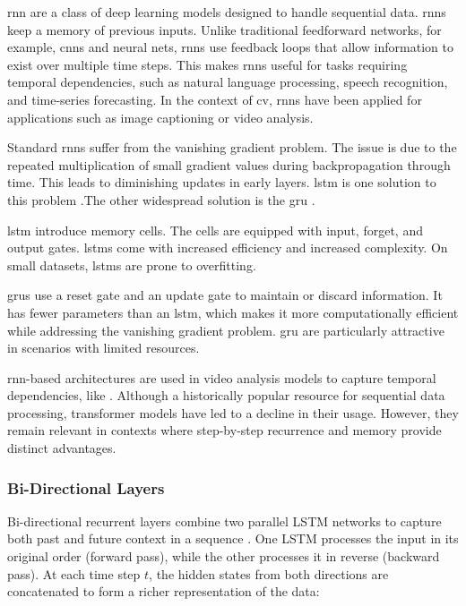 \acrfull{rnn} are a class of deep learning models designed to handle sequential data. \acrshort{rnn}s keep a memory of previous inputs. Unlike traditional feedforward networks, for example, \acrshort{cnn}s and neural nets, \acrshort{rnn}s use feedback loops that allow information to exist over multiple time steps.  This makes \acrshort{rnn}s useful for tasks requiring temporal dependencies, such as natural language processing, speech recognition, and time-series forecasting\cite{ibm_rnn_2025}. In the context of \acrfull{cv}, \acrshort{rnn}s have been applied for applications such as image captioning or video analysis. 

Standard \acrshort{rnn}s suffer from the vanishing gradient problem. The issue is due to the repeated multiplication of small gradient values during backpropagation through time. This leads to diminishing updates in early layers. \acrfull{lstm} is one solution to this problem \cite{bhogal_human_2023, kumar_human_2023, mahaseni_spotting_2021}.The other widespread solution is the \acrfull{gru} \cite{giveki_human_2024,li_oarnet_2024,yu_i3d_2023}. 

\acrlong{lstm} introduce memory cells. The cells are equipped with input, forget, and output gates. \acrshort{lstm}s come with increased efficiency and increased complexity. On small datasets, \acrshort{lstm}s are prone to overfitting. 

\acrlong{gru}s use a reset gate and an update gate to maintain or discard information. It has fewer parameters than an \acrshort{lstm}, which makes it more computationally efficient while addressing the vanishing gradient problem. \acrshort{gru} are particularly attractive in scenarios with limited resources. 

\acrshort{rnn}-based architectures are used in video analysis models to capture temporal dependencies, like \textcite{bhogal_human_2023}. Although a historically popular resource for sequential data processing, transformer models have led to a decline in their usage. However, they remain relevant in contexts where step-by-step recurrence and memory provide distinct advantages\cite{ibm_rnn_2025}.

\subsubsection{Bi-Directional Layers}
\label{ssec:bi_directional_layers}

Bi-directional recurrent layers combine two parallel LSTM networks to capture both past and future context in a sequence \cite{radhakrishnan_bi_lstm_2023, bhogal_human_2023}. One LSTM processes the input in its original order (forward pass), while the other processes it in reverse (backward pass). At each time step \(t\), the hidden states from both directions are concatenated to form a richer representation of the data:


